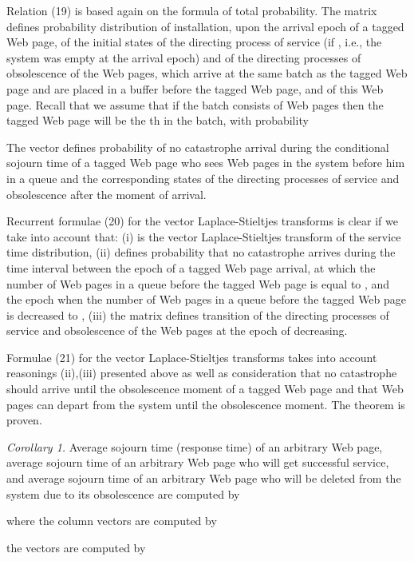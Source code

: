 \documentclass[11pt]{article}
\begin{document}
Relation (19) is based again on the formula of total probability.
The matrix  defines probability distribution of
installation, upon the arrival epoch of a tagged Web page,  of the
initial states of the directing process of service (if , i.e.,
the system was empty at the arrival epoch) and of the directing
processes of obsolescence of the Web pages, which arrive at the same
batch as the tagged Web page and are placed in a buffer before the
tagged Web page, and  of this Web page. Recall that we assume that
 if the batch consists of  Web pages then the
tagged Web page will be the th in the batch, 
with probability 

The vector  defines probability of no
catastrophe arrival during the conditional sojourn time of a tagged
Web page who sees  Web pages in the system before him in a queue
 and the corresponding states of the
directing processes of service and obsolescence after the moment of
arrival.

Recurrent formulae (20) for the vector Laplace-Stieltjes transforms
 is clear if we take into account that: (i)  is the vector Laplace-Stieltjes transform of
the service time distribution, (ii) 
defines probability that no catastrophe arrives during the time
interval between the epoch of a tagged Web page arrival, at which
the number of Web pages in a queue before the tagged Web page is
equal to , and the epoch when the number of Web pages in a queue
before the tagged Web page is decreased to , (iii) the matrix
 defines transition of the directing processes
of service and obsolescence of the Web pages at the epoch of
decreasing.

Formulae (21) for the vector Laplace-Stieltjes transforms  takes into account reasonings (ii),(iii) presented
above as well as consideration that no catastrophe should arrive
until the obsolescence moment of a tagged Web page and that  Web pages can depart from the system until the
obsolescence moment. The theorem is proven.

{\it Corollary 1.}  Average sojourn time (response time)  of
an arbitrary Web page, average sojourn time   of an
arbitrary Web page who will get successful service, and average
sojourn time   of an arbitrary Web page who will be
deleted from the system due to its obsolescence are computed by



where the column vectors  are computed by

 the vectors  are
computed  by
\end{document}
